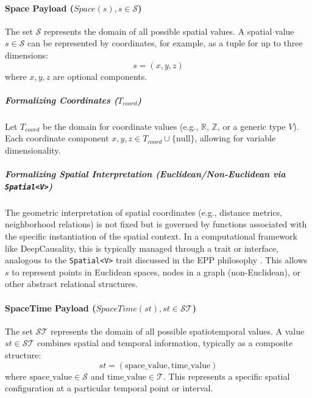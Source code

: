             \paragraph[Space Payload]{Space Payload (\(Space(s), s \in \mathcal{S}\))}\label{par:space_payload}
            
            The set \(\mathcal{S}\) represents the domain of all possible spatial values. A spatial value \(s \in \mathcal{S}\) can be represented by coordinates, for example, as a tuple for up to three dimensions:
            \[ s = (x, y, z) \]
            where \(x, y, z\) are optional components.
            
                \subparagraph[Coordinates]{Formalizing Coordinates (\(T_{coord}\))}
                \label{subpar:coordinates}
                
                Let \(T_{coord}\) be the domain for coordinate values (e.g., \(\mathbb{R}\), \(\mathbb{Z}\), or a generic type \(V\)). Each coordinate component \(x, y, z \in T_{coord} \cup \{\text{null}\}\), allowing for variable dimensionality.
                
                \subparagraph[Spatial Interpretation]{Formalizing Spatial Interpretation (Euclidean/Non-Euclidean via \texttt{Spatial<V>})}
                \label{subpar:spatial_interpretation}
                
                The geometric interpretation of spatial coordinates (e.g., distance metrics, neighborhood relations) is not fixed but is governed by functions associated with the specific instantiation of the spatial context. In a computational framework like DeepCausality, this is typically managed through a trait or interface, analogous to the \texttt{Spatial<V>} trait discussed in the EPP philosophy \cite{Hansen2025EPP}. This allows \(s\) to represent points in Euclidean spaces, nodes in a graph (non-Euclidean), or other abstract relational structures.


            \paragraph[SpaceTime Payload]{SpaceTime Payload (\(SpaceTime(st), st \in \mathcal{ST}\))}\label{par:spacetime_payload}
            
            The set \(\mathcal{ST}\) represents the domain of all possible spatiotemporal values. A value \(st \in \mathcal{ST}\) combines spatial and temporal information, typically as a composite structure:
            \[ st = (\text{space\_value}, \text{time\_value}) \]
            where \(\text{space\_value} \in \mathcal{S}\) and \(\text{time\_value} \in \mathcal{T}\). This represents a specific spatial configuration at a particular temporal point or interval.


